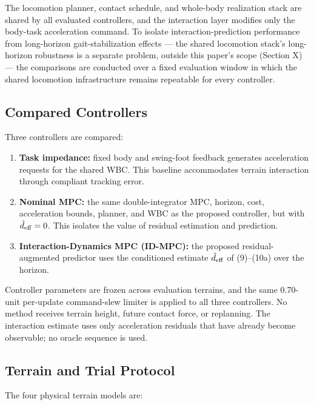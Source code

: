\documentclass[journal]{IEEEtran}
\theoremstyle{plain}
\theoremstyle{definition}
\begin{document}
The locomotion planner, contact schedule, and whole-body realization stack are shared by all evaluated controllers, and the interaction layer modifies only the body-task acceleration command. To isolate interaction-prediction performance from long-horizon gait-stabilization effects --- the shared locomotion stack's long-horizon robustness is a separate problem, outside this paper's scope (Section X) --- the comparisons are conducted over a fixed evaluation window in which the shared locomotion infrastructure remains repeatable for every controller.

\subsection{Compared Controllers}

Three controllers are compared:

\begin{enumerate}
\def\labelenumi{\arabic{enumi}.}
\item
  \textbf{Task impedance:} fixed body and swing-foot feedback generates acceleration requests for the shared WBC. This baseline accommodates terrain interaction through compliant tracking error.
\item
  \textbf{Nominal MPC:} the same double-integrator MPC, horizon, cost, acceleration bounds, planner, and WBC as the proposed controller, but with \(\hat d_{\rm eff}=0\). This isolates the value of residual estimation and prediction.
\item
  \textbf{Interaction-Dynamics MPC (ID-MPC):} the proposed residual-augmented predictor uses the conditioned estimate \(\tilde d_{\rm eff}\) of (9)--(10a) over the horizon.
\end{enumerate}

Controller parameters are frozen across evaluation terrains, and the same 0.70-unit per-update command-slew limiter is applied to all three controllers. No method receives terrain height, future contact force, or replanning. The interaction estimate uses only acceleration residuals that have already become observable; no oracle sequence is used.

\subsection{Terrain and Trial Protocol}

The four physical terrain models are:
\end{document}
